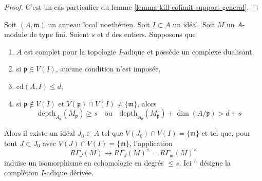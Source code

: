 \begin{proof}
C'est un cas particulier du lemme \ref{lemma-kill-colimit-support-general}.
\end{proof}

\begin{lemma}
\label{lemma-algebraize-local-cohomology}
Soit $(A, \mathfrak m)$ un anneau local noethérien.
Soit $I \subset A$ un idéal. Soit $M$ un $A$-module de type fini.
Soient $s$ et $d$ des entiers. Supposons que
\begin{enumerate}
\item $A$ est complet pour la topologie $I$-adique et possède un complexe dualisant,
\item si $\mathfrak p \in V(I)$, aucune condition n'est imposée,
\item $\text{cd}(A, I) \leq d$,
\item si $\mathfrak p \not \in V(I)$ et
$V(\mathfrak p) \cap V(I) \not = \{\mathfrak m\}$, alors
$$
\text{depth}_{A_\mathfrak p}(M_\mathfrak p) \geq s
\quad\text{ou}\quad
\text{depth}_{A_\mathfrak p}(M_\mathfrak p) + \dim(A/\mathfrak p) > d + s
$$
\end{enumerate}
Alors il existe un idéal $J_0 \subset A$ tel que
$V(J_0) \cap V(I) = \{\mathfrak m\}$ et tel que, pour tout $J \subset J_0$ avec
$V(J) \cap V(I) = \{\mathfrak m\}$, l'application
$$
R\Gamma_J(M) \longrightarrow
R\Gamma_J(M)^\wedge = R\Gamma_\mathfrak m(M)^\wedge
$$
induise un isomorphisme en cohomologie en degrés $\leq s$.
Ici ${}^\wedge$ désigne la complétion $I$-adique dérivée.
\end{lemma}

